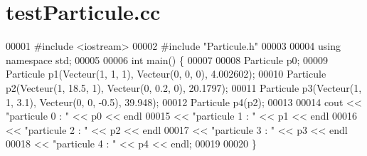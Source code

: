 \section{test\+Particule.\+cc}
\label{test_particule_8cc_source}

\begin{DoxyCode}
00001 \textcolor{preprocessor}{#include <iostream>}
00002 \textcolor{preprocessor}{#include "Particule.h"}
00003 
00004 \textcolor{keyword}{using namespace }std;
00005 
00006 \textcolor{keywordtype}{int} main() \{
00007     
00008     Particule p0;
00009     Particule p1(Vecteur(1, 1, 1), Vecteur(0, 0, 0), 4.002602);
00010     Particule p2(Vecteur(1, 18.5, 1), Vecteur(0, 0.2, 0), 20.1797);
00011     Particule p3(Vecteur(1, 1, 3.1), Vecteur(0, 0, -0.5), 39.948);
00012     Particule p4(p2);
00013     
00014     cout << \textcolor{stringliteral}{"particule 0 : "} << p0 << endl
00015          << \textcolor{stringliteral}{"particule 1 : "} << p1 << endl
00016          << \textcolor{stringliteral}{"particule 2 : "} << p2 << endl
00017          << \textcolor{stringliteral}{"particule 3 : "} << p3 << endl
00018          << \textcolor{stringliteral}{"particule 4 : "} << p4 << endl;
00019     
00020 \}
\end{DoxyCode}
